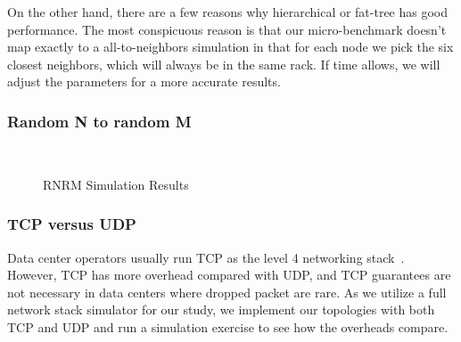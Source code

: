 On the other hand, there are a few reasons why hierarchical or fat-tree has good performance. The most conspicuous reason is that our micro-benchmark doesn't map exactly to a all-to-neighbors simulation in that for each node we pick the six closest neighbors, which will always be in the same rack. If time allows, we will adjust the parameters for a more accurate results.

\subsubsection{Random N to random M}

\captionsetup[subfloat]{captionskip=-0.003in}
\begin{figure}
    \centering
    \\
    \vspace{-0.1in}
    \vspace{-0.07in}
    \caption{RNRM Simulation Results}
\end{figure}


\subsubsection{TCP versus UDP}
Data center operators usually run TCP as the level 4 networking stack~\cite{Regnier:2004:TCPODCS,Alizadeh:2010:DCT,Kandula:2009:NDC}. However, TCP has more overhead compared with UDP, and TCP guarantees are not necessary in data centers where dropped packet are rare. As we utilize a full network stack simulator for our study, we implement our topologies with both TCP and UDP and run a simulation exercise to see how the overheads compare.

